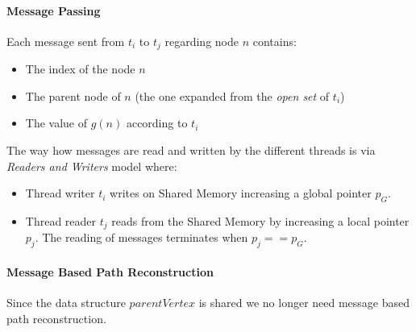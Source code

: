 \documentclass[twocolumn, switch]{article} %
\begin{document}
\paragraph{Message Passing} Each message sent from $t_i$ to $t_j$ regarding node $n$ contains:
\begin{itemize}
  \item The index of the node $n$
  \item The parent node of $n$ (the one expanded from the \textit{open set} of $t_i$)
  \item The value of $g(n)$ according to $t_i$
\end{itemize}
The way how messages are read and written by the different threads is via \textit{Readers and Writers}
model where:
\begin{itemize}
  \item Thread writer $t_i$ writes on Shared Memory increasing a global pointer $p_G$.
  \item Thread reader $t_j$ reads from the Shared Memory by increasing a local pointer $p_j$. The reading
        of messages terminates when $p_j == p_G$.
\end{itemize}
\paragraph{Message Based Path Reconstruction}
Since the data structure $parentVertex$ is shared we no longer need message based path reconstruction.
\end{document}
